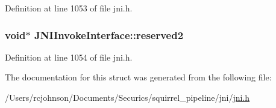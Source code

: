 Definition at line 1053 of file jni.\-h.

\hypertarget{struct_j_n_i_invoke_interface_a42cba639995c9d29a45b7581c7350010}{
\subsubsection[{reserved2}]{\setlength{\rightskip}{0pt plus 5cm}void$\ast$ J\-N\-I\-Invoke\-Interface\-::reserved2}}\label{struct_j_n_i_invoke_interface_a42cba639995c9d29a45b7581c7350010}


Definition at line 1054 of file jni.\-h.



The documentation for this struct was generated from the following file\-:\begin{DoxyCompactItemize}
\item 
/\-Users/rcjohnson/\-Documents/\-Securics/squirrel\-\_\-pipeline/jni/\hyperlink{jni_8h}{jni.\-h}\end{DoxyCompactItemize}
